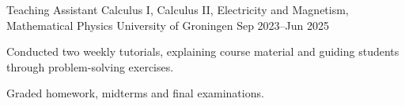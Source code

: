 

\begin{cventries}


  \cventry
  {Teaching Assistant} %
  {Calculus I,  Calculus II, Electricity and Magnetism, Mathematical Physics} %
  {University of Groningen} %
  {Sep 2023--Jun 2025} %
  {
    \begin{cvitems} %
      \item {Conducted two weekly tutorials, explaining course material and guiding students through problem-solving exercises.}
      \item {Graded homework, midterms and final examinations.}
    \end{cvitems}
  }


\end{cventries}

